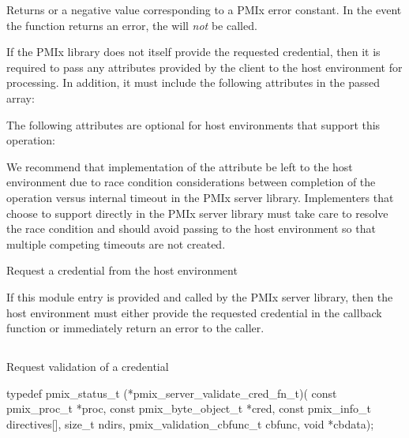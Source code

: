 Returns  or a negative value corresponding to a PMIx error constant. In the event the function returns an error, the  will \textit{not} be called.

\reqattrstart
If the \ac{PMIx} library does not itself provide the requested credential, then it is required to pass any attributes provided by the client to the host environment for processing. In addition, it must include the following attributes in the passed  array:


\reqattrend

\optattrstart
The following attributes are optional for host environments that support this operation:


\optattrend

\adviceimplstart
We recommend that implementation of the  attribute be left to the host environment due to race condition considerations between completion of the operation versus internal timeout in the \ac{PMIx} server library. Implementers that choose to support  directly in the \ac{PMIx} server library must take care to resolve the race condition and should avoid passing  to the host environment so that multiple competing timeouts are not created.
\adviceimplend


\descr

Request a credential from the host environment

\advicermstart
If this module entry is provided and called by the \ac{PMIx} server library, then the host environment must either provide the requested credential in the callback function or immediately return an error to the caller.
\advicermend

\subsection{}

\summary

Request validation of a credential

\format

\cspecificstart
\begin{codepar}
typedef pmix_status_t (*pmix_server_validate_cred_fn_t)(
                             const pmix_proc_t *proc,
                             const pmix_byte_object_t *cred,
                             const pmix_info_t directives[],
                             size_t ndirs,
                             pmix_validation_cbfunc_t cbfunc,
                             void *cbdata);
\end{codepar}
\cspecificend

